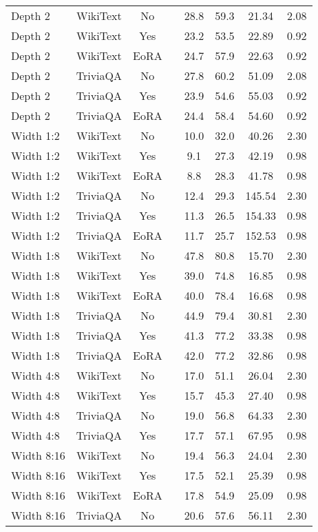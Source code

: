\begin{longtable}{lcclcccc}
\hline
\endlastfoot
Depth 2 & WikiText & No & & 28.8 & 59.3 & 21.34 & 2.08 \\
Depth 2 & WikiText & Yes & & 23.2 & 53.5 & 22.89 & 0.92 \\
Depth 2 & WikiText & EoRA & & 24.7 & 57.9 & 22.63 & 0.92 \\
Depth 2 & TriviaQA & No & & 27.8 & 60.2 & 51.09 & 2.08 \\
Depth 2 & TriviaQA & Yes & & 23.9 & 54.6 & 55.03 & 0.92 \\
Depth 2 & TriviaQA & EoRA & & 24.4 & 58.4 & 54.60 & 0.92 \\
Width 1:2 & WikiText & No & & 10.0 & 32.0 & 40.26 & 2.30 \\
Width 1:2 & WikiText & Yes & & 9.1 & 27.3 & 42.19 & 0.98 \\
Width 1:2 & WikiText & EoRA & & 8.8 & 28.3 & 41.78 & 0.98 \\
Width 1:2 & TriviaQA & No & & 12.4 & 29.3 & 145.54 & 2.30 \\
Width 1:2 & TriviaQA & Yes & & 11.3 & 26.5 & 154.33 & 0.98 \\
Width 1:2 & TriviaQA & EoRA & & 11.7 & 25.7 & 152.53 & 0.98 \\
Width 1:8 & WikiText & No & & 47.8 & 80.8 & 15.70 & 2.30 \\
Width 1:8 & WikiText & Yes & & 39.0 & 74.8 & 16.85 & 0.98 \\
Width 1:8 & WikiText & EoRA & & 40.0 & 78.4 & 16.68 & 0.98 \\
Width 1:8 & TriviaQA & No & & 44.9 & 79.4 & 30.81 & 2.30 \\
Width 1:8 & TriviaQA & Yes & & 41.3 & 77.2 & 33.38 & 0.98 \\
Width 1:8 & TriviaQA & EoRA & & 42.0 & 77.2 & 32.86 & 0.98 \\
Width 4:8 & WikiText & No & & 17.0 & 51.1 & 26.04 & 2.30 \\
Width 4:8 & WikiText & Yes & & 15.7 & 45.3 & 27.40 & 0.98 \\
Width 4:8 & TriviaQA & No & & 19.0 & 56.8 & 64.33 & 2.30 \\
Width 4:8 & TriviaQA & Yes & & 17.7 & 57.1 & 67.95 & 0.98 \\
Width 8:16 & WikiText & No & & 19.4 & 56.3 & 24.04 & 2.30 \\
Width 8:16 & WikiText & Yes & & 17.5 & 52.1 & 25.39 & 0.98 \\
Width 8:16 & WikiText & EoRA & & 17.8 & 54.9 & 25.09 & 0.98 \\
Width 8:16 & TriviaQA & No & & 20.6 & 57.6 & 56.11 & 2.30 \\

\end{longtable}
